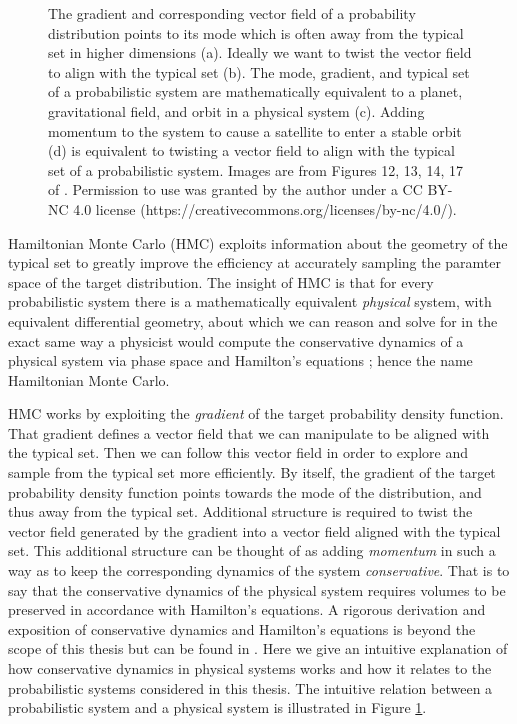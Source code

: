 \begin{figure}
	\caption{The gradient and corresponding vector field of a probability distribution points to its mode which is often away from the typical set in higher dimensions (a). Ideally we want to twist the vector field to align with the typical set (b). The mode, gradient, and typical set of a probabilistic system are mathematically equivalent to a planet, gravitational field, and orbit in a physical system (c). Adding momentum to the system to cause a satellite to enter a stable orbit (d) is equivalent to twisting a vector field to align with the typical set of a probabilistic system. Images are from Figures 12, 13, 14, 17 of \cite{Betancourt2017}. Permission to use was granted by the author under a CC BY-NC 4.0 license (https://creativecommons.org/licenses/by-nc/4.0/).}
	\label{fig:hmc}
\end{figure}

Hamiltonian Monte Carlo (HMC) exploits information about the geometry of the typical set to greatly improve the efficiency at accurately sampling the paramter space of the target distribution. The insight of HMC is that for every probabilistic system there is a mathematically equivalent \textit{physical} system, with equivalent differential geometry, about which we can reason and solve for in the exact same way a physicist would compute the conservative dynamics of a physical system via phase space and Hamilton's equations \cite{Betancourt2017}; hence the name Hamiltonian Monte Carlo.

HMC works by exploiting the \textit{gradient} of the target probability density function. That gradient defines a vector field that we can manipulate to be aligned with the typical set. Then we can follow this vector field in order to explore and sample from the typical set more efficiently. By itself, the gradient of the target probability density function points towards the mode of the distribution, and thus away from the typical set. Additional structure is required to twist the vector field generated by the gradient into a vector field aligned with the typical set. This additional structure can be thought of as adding \textit{momentum} in such a way as to keep the corresponding dynamics of the system \textit{conservative}. That is to say that the conservative dynamics of the physical system requires volumes to be preserved in accordance with Hamilton's equations. A rigorous derivation and exposition of conservative dynamics and Hamilton's equations is beyond the scope of this thesis but can be found in \cite{Betancourt2017}. Here we give an intuitive explanation of how conservative dynamics in physical systems works and how it relates to the probabilistic systems considered in this thesis. The intuitive relation between a probabilistic system and a physical system is illustrated in Figure \ref{fig:hmc}.

